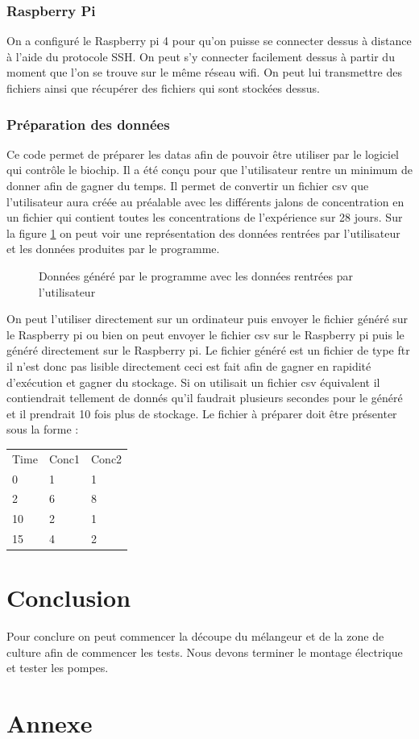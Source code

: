 \documentclass[a4paper, 11pt]{article}
\begin{document}
\subsubsection{Raspberry Pi}
On a configuré le Raspberry pi 4 pour qu'on puisse se connecter dessus à distance à l'aide du protocole SSH.
On peut s'y connecter facilement dessus à partir du moment que l'on se trouve sur le même réseau wifi.
On peut lui transmettre des fichiers ainsi que récupérer des fichiers qui sont stockées dessus.
\subsubsection{Préparation des données}
Ce code permet de préparer les datas afin de pouvoir être utiliser par le logiciel qui contrôle le biochip.
Il a été conçu pour que l'utilisateur rentre un minimum de donner afin de gagner du temps.
Il permet de convertir un fichier csv que l'utilisateur aura créée au préalable avec les différents jalons de concentration en un fichier qui contient toutes les concentrations de l'expérience sur 28 jours.
Sur la figure \ref{fig:dataPreparation} on peut voir une représentation des données rentrées par l'utilisateur et les données produites par le programme.
\begin{figure}[H]
    \centering
    \caption{Données généré par le programme avec les données rentrées par l'utilisateur}
    \label{fig:dataPreparation}
\end{figure}
On peut l'utiliser directement sur un ordinateur puis envoyer le fichier généré sur le Raspberry pi ou bien on peut envoyer le fichier csv sur le Raspberry pi puis le généré directement sur le Raspberry pi.
Le fichier généré est un fichier de type ftr il n'est donc pas lisible directement ceci est fait afin de gagner en rapidité d'exécution et gagner du stockage.
Si on utilisait un fichier csv équivalent il contiendrait tellement de donnés qu'il faudrait plusieurs secondes pour le généré et il prendrait 10 fois plus de stockage.
Le fichier à préparer doit être présenter sous la forme :
\begin{table}[H]
    \centering
    \begin{tabular}{lll}
        Time & Conc1 & Conc2 \\
        0    & 1     & 1     \\
        2    & 6     & 8     \\
        10   & 2     & 1     \\
        15   & 4     & 2
    \end{tabular}
\end{table}
\newpage
\section{Conclusion}
Pour conclure on peut commencer la découpe du mélangeur et de la zone de culture afin de commencer les tests.
Nous devons terminer le montage électrique et tester les pompes.
\newpage
\section{Annexe}

\newpage
\printbibliography
\end{document}
